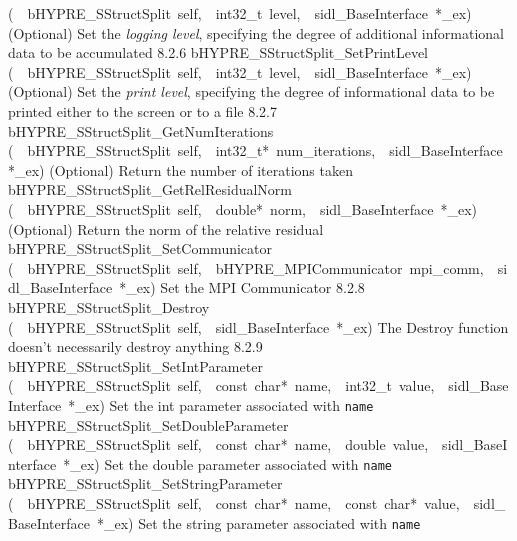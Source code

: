\documentclass{article}
\begin{document}
\begin{cxxentry}
\begin{cxxentry}
\begin{cxxnames}
        {(\ \ bHYPRE\_SStructSplit\ self,\ \ int32\_t\ level,\ \ sidl\_BaseInterface\ *\_ex)}
        {
(Optional) Set the {\it logging level}, specifying the degree
of additional informational data to be accumulated}
        {8.2.6}
        {bHYPRE\_SStructSplit\_SetPrintLevel}
        {(\ \ bHYPRE\_SStructSplit\ self,\ \ int32\_t\ level,\ \ sidl\_BaseInterface\ *\_ex)}
        {
(Optional) Set the {\it print level}, specifying the degree
of informational data to be printed either to the screen or
to a file}
        {8.2.7}
        {bHYPRE\_SStructSplit\_GetNumIterations}
        {(\ \ bHYPRE\_SStructSplit\ self,\ \ int32\_t*\ num\_iterations,\ \ sidl\_BaseInterface\ *\_ex)}
        {
(Optional) Return the number of iterations taken}
        {}
\label{cxx.8.2.15}
        {bHYPRE\_SStructSplit\_GetRelResidualNorm}
        {(\ \ bHYPRE\_SStructSplit\ self,\ \ double*\ norm,\ \ sidl\_BaseInterface\ *\_ex)}
        {
(Optional) Return the norm of the relative residual}
        {}
\label{cxx.8.2.16}
        {bHYPRE\_SStructSplit\_SetCommunicator}
        {(\ \ bHYPRE\_SStructSplit\ self,\ \ bHYPRE\_MPICommunicator\ mpi\_comm,\ \ sidl\_BaseInterface\ *\_ex)}
        {
Set the MPI Communicator}
        {8.2.8}
        {bHYPRE\_SStructSplit\_Destroy}
        {(\ \ bHYPRE\_SStructSplit\ self,\ \ sidl\_BaseInterface\ *\_ex)}
        {
The Destroy function doesn't necessarily destroy anything}
        {8.2.9}
        {bHYPRE\_SStructSplit\_SetIntParameter}
        {(\ \ bHYPRE\_SStructSplit\ self,\ \ const\ char*\ name,\ \ int32\_t\ value,\ \ sidl\_BaseInterface\ *\_ex)}
        {
Set the int parameter associated with {\tt name}}
        {}
\label{cxx.8.2.17}
        {bHYPRE\_SStructSplit\_SetDoubleParameter}
        {(\ \ bHYPRE\_SStructSplit\ self,\ \ const\ char*\ name,\ \ double\ value,\ \ sidl\_BaseInterface\ *\_ex)}
        {
Set the double parameter associated with {\tt name}}
        {}
\label{cxx.8.2.18}
        {bHYPRE\_SStructSplit\_SetStringParameter}
        {(\ \ bHYPRE\_SStructSplit\ self,\ \ const\ char*\ name,\ \ const\ char*\ value,\ \ sidl\_BaseInterface\ *\_ex)}
        {
Set the string parameter associated with {\tt name}}
        {}
\label{cxx.8.2.19}

\end{cxxnames}
\end{cxxentry}
\end{cxxentry}
\end{document}
